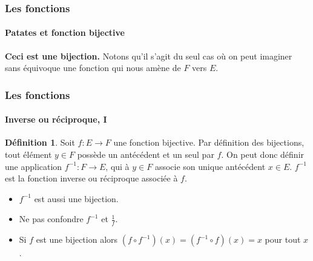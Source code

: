 \documentclass[10pt,notheorems]{beamer}
\theoremstyle{plain}
\theoremstyle{definition} %
\newtheorem{definition}{Définition}
\begin{document}
\begin{frame}
  \frametitle{Les fonctions}
  \framesubtitle{Patates et fonction bijective}
  \hypertarget{slide_fonctions_fig_5}{}

  \begin{center}

    \bigskip

    \textbf{Ceci est une bijection.} Notons qu'il s'agit du seul cas où on peut imaginer sans équivoque une fonction qui nous amène de $F$ vers $E$.

  \end{center}

\end{frame}


\begin{frame}
  \frametitle{Les fonctions}
  \framesubtitle{Inverse ou réciproque, I}
  \hypertarget{slide_fonctions_reciproque_1}{}

  \begin{definition}\label{def:fonction_reciproque}
    Soit $f : E\rightarrow F$ une fonction bijective. Par définition des bijections, tout élément $y\in F$ possède un antécédent et un seul par $f$. On peut donc définir une application $f^{-1}: F\rightarrow E$, qui à $y\in F$ associe son unique antécédent $x\in E$. $f^{-1}$ est la fonction inverse ou réciproque associée à $f$.
  \end{definition}

  \bigskip

  \begin{itemize}
  \item $f^{-1}$ est aussi une bijection.\newline
  \item[\dbend] Ne pas confondre $f^{-1}$ et $\frac{1}{f}$.\newline
  \item Si $f$ est une bijection alors $(f \circ f^{-1})(x) = (f^{-1} \circ f)(x) = x$ pour tout $x$.
  \end{itemize}

\end{frame}
\end{document}
